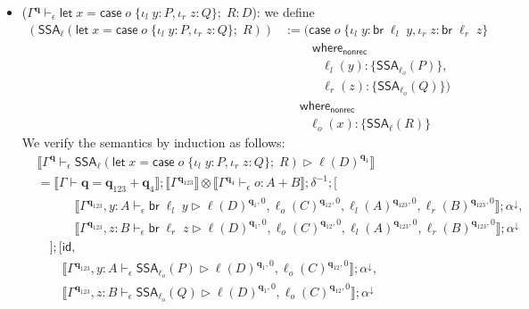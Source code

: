 \documentclass[acmsmall,screen,anonymous,review]{acmart}
\newcommand{\mb}[1]{\ensuremath{\mathbf{#1}}}
\newcommand{\ms}[1]{\ensuremath{\mathsf{#1}}}
\newcommand{\lto}{:}
\newcommand{\linl}[1]{\iota_l\;{#1}}
\newcommand{\linr}[1]{\iota_r\;{#1}}
\newcommand{\letexpr}[3]{\ensuremath{\ms{let}\;#1 = #2;\;#3}}
\newcommand{\caseexpr}[5]{\ms{case}\;#1\;\{\linl{#2} \lto #3, \linr{#4} \lto #5\}}
\newcommand{\brb}[2]{\ms{br}\;#1\;#2}
\newcommand{\casestmt}[5]{\ms{case}\;#1\;\{\linl{#2} \lto #3, \linr{#4} \lto #5\}}
\newcommand{\awhere}[2]{#1\;\ms{where}_{\ms{nonrec}}\;#2}
\newcommand{\wbranch}[3]{#1(#2) \lto \{#3\}}
\newcommand{\qsp}[4]{#1 \vdash #2 = #3 + #4}
\newcommand{\hasty}[4]{#1 \vdash_{#2} #3: {#4}}
\newcommand{\haslb}[4]{#1 \vdash_{#2} #3 \rhd #4}
\newcommand{\tossa}[2]{\ms{SSA}_{#1}(#2)}
\newcommand{\dnt}[1]{\llbracket{#1}\rrbracket}
\begin{document}
\begin{itemize}
\begin{align*}
  \end{align*}
  \item ($\hasty{\Gamma^{\mb{q}}}{\epsilon}{\letexpr{x}{\caseexpr{o}{y}{P}{z}{Q}}{R}}{D}$): we
  define
  \begin{align*}
    (\tossa{\ell}{\letexpr{x}{\caseexpr{o}{y}{P}{z}{Q}}{R}})
    & := \awhere{(\awhere{\casestmt{o}{y}{\brb{\ell_l}{y}}{z}{\brb{\ell_r}{z}} \\ & \qquad }{
      \\ & \quad \qquad
      \wbranch{\ell_l}{y}{\tossa{\ell_o}{P}},
      \\ & \quad \qquad
      \wbranch{\ell_r}{z}{\tossa{\ell_o}{Q}})
    } \\ & \quad }{
      \\ & \qquad
      \wbranch{\ell_o}{x}{\tossa{\ell}{R}}
    }
  \end{align*}
  We verify the semantics by induction as follows:
  \begin{align*}
    & \dnt{
      \haslb{\Gamma^{\mb{q}}}{\epsilon}{\tossa{\ell}{\letexpr{x}{\caseexpr{o}{y}{P}{z}{Q}}{R}}}
      {\ell(D)^{\mb{q}_1}}
    } \\
    & = \dnt{\qsp{\Gamma}{\mb{q}}{\mb{q}_{123}}{\mb{q}_4}} 
      ; \dnt{\Gamma^{\mb{q}_{123}}} \otimes \dnt{\hasty{\Gamma^{\mb{q}_4}}{\epsilon}{o}{A + B}}
      ; \delta^{-1} ; [
      \\ & \quad \qquad
        \dnt{\haslb{\Gamma^{\mb{q}_{123}}, y : A}{\epsilon}{\brb{\ell_l}{y}}
          {
            \ell(D)^{\mb{q}_1, 0}, \ell_o(C)^{\mb{q}_{12}, 0}, 
            \ell_l(A)^{\mb{q}_{123}, 0}}, \ell_r(B)^{\mb{q}_{123}, 0}} 
          ; \alpha^\downarrow,
      \\ & \quad \qquad
        \dnt{\haslb{\Gamma^{\mb{q}_{123}}, z : B}{\epsilon}{\brb{\ell_r}{z}}
          {
            \ell(D)^{\mb{q}_1, 0}, \ell_o(C)^{\mb{q}_{12}, 0}, 
            \ell_l(A)^{\mb{q}_{123}, 0}}, \ell_r(B)^{\mb{q}_{123}, 0}} 
          ; \alpha^\downarrow
      \\ & \quad
      ];[
        \ms{id}, \\ & \qquad
        \dnt{
          \haslb{\Gamma^{\mb{q}_{123}}, y : A}{\epsilon}{\tossa{\ell_o}{P}}
                {\ell(D)^{\mb{q}_1, 0}, \ell_o(C)^{\mb{q}_{12}, 0}}
        } ; \alpha^\downarrow, \\ & \qquad
        \dnt{
          \haslb{\Gamma^{\mb{q}_{123}}, z : B}{\epsilon}{\tossa{\ell_o}{Q}}
                {\ell(D)^{\mb{q}_1, 0}, \ell_o(C)^{\mb{q}_{12}, 0}} 
        } ; \alpha^\downarrow
      \\ & \quad

\end{align*}
\end{itemize}
\end{document}
